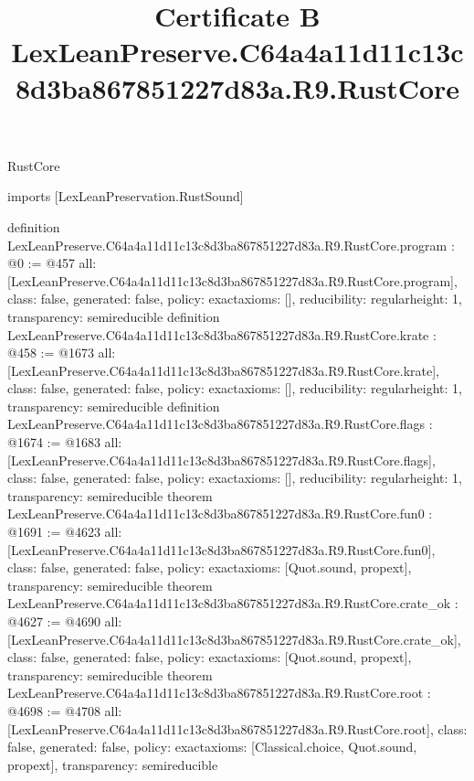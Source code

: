 \begin{lexlean}{RustCore}
\title{Certificate B LexLeanPreserve.C64a4a11d11c13c8d3ba867851227d83a.R9.RustCore}
\begin{coremodule}
imports [LexLeanPreservation.RustSound]

definition LexLeanPreserve.C64a4a11d11c13c8d3ba867851227d83a.R9.RustCore.program : @0 := @457 {
  all: [LexLeanPreserve.C64a4a11d11c13c8d3ba867851227d83a.R9.RustCore.program],
  class: false,
  generated: false,
  policy: exact{axioms: []},
  reducibility: regular{height: 1},
  transparency: semireducible
}
definition LexLeanPreserve.C64a4a11d11c13c8d3ba867851227d83a.R9.RustCore.krate : @458 := @1673 {
  all: [LexLeanPreserve.C64a4a11d11c13c8d3ba867851227d83a.R9.RustCore.krate],
  class: false,
  generated: false,
  policy: exact{axioms: []},
  reducibility: regular{height: 1},
  transparency: semireducible
}
definition LexLeanPreserve.C64a4a11d11c13c8d3ba867851227d83a.R9.RustCore.flags : @1674 := @1683 {
  all: [LexLeanPreserve.C64a4a11d11c13c8d3ba867851227d83a.R9.RustCore.flags],
  class: false,
  generated: false,
  policy: exact{axioms: []},
  reducibility: regular{height: 1},
  transparency: semireducible
}
theorem LexLeanPreserve.C64a4a11d11c13c8d3ba867851227d83a.R9.RustCore.fun0 : @1691 := @4623 {
  all: [LexLeanPreserve.C64a4a11d11c13c8d3ba867851227d83a.R9.RustCore.fun0],
  class: false,
  generated: false,
  policy: exact{axioms: [Quot.sound, propext]},
  transparency: semireducible
}
theorem LexLeanPreserve.C64a4a11d11c13c8d3ba867851227d83a.R9.RustCore.crate_ok : @4627 := @4690 {
  all: [LexLeanPreserve.C64a4a11d11c13c8d3ba867851227d83a.R9.RustCore.crate_ok],
  class: false,
  generated: false,
  policy: exact{axioms: [Quot.sound, propext]},
  transparency: semireducible
}
theorem LexLeanPreserve.C64a4a11d11c13c8d3ba867851227d83a.R9.RustCore.root : @4698 := @4708 {
  all: [LexLeanPreserve.C64a4a11d11c13c8d3ba867851227d83a.R9.RustCore.root],
  class: false,
  generated: false,
  policy: exact{axioms: [Classical.choice, Quot.sound, propext]},
  transparency: semireducible
}


\end{coremodule}
\end{lexlean}
